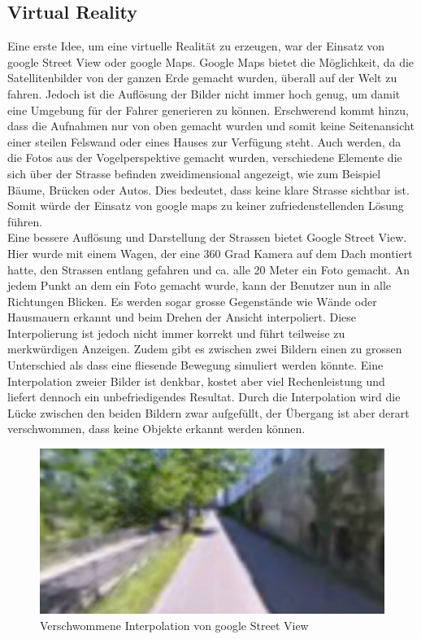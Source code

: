 \subsection{Virtual Reality}
Eine erste Idee, um eine virtuelle Realität zu erzeugen, war der Einsatz von google Street View oder google Maps. Google Maps bietet die Möglichkeit, da die Satellitenbilder von der ganzen Erde gemacht wurden, überall auf der Welt zu fahren. Jedoch ist die Auflösung der Bilder nicht immer hoch genug, um damit eine Umgebung für der Fahrer generieren zu können. Erschwerend kommt hinzu, dass die Aufnahmen nur von oben gemacht wurden und somit keine Seitenansicht einer steilen Felswand oder eines Hauses zur Verfügung steht. Auch werden, da die Fotos aus der Vogelperspektive gemacht wurden, verschiedene Elemente die sich über der Strasse befinden zweidimensional angezeigt, wie zum Beispiel Bäume, Brücken oder Autos. Dies bedeutet, dass keine klare Strasse sichtbar ist. Somit würde der Einsatz von google maps zu keiner zufriedenstellenden Lösung führen. \\
Eine bessere Auflösung und Darstellung der Strassen bietet Google Street View. Hier wurde mit einem Wagen, der eine 360 Grad Kamera auf dem Dach montiert hatte, den Strassen entlang gefahren und ca. alle 20 Meter ein Foto gemacht. An jedem Punkt an dem ein Foto gemacht wurde, kann der Benutzer nun in alle Richtungen Blicken. Es werden sogar grosse Gegenstände wie Wände oder Hausmauern erkannt und beim Drehen der Ansicht interpoliert. Diese Interpolierung ist jedoch nicht immer korrekt und führt teilweise zu merkwürdigen Anzeigen. Zudem gibt es zwischen zwei Bildern einen zu grossen Unterschied als dass eine fliesende Bewegung simuliert werden könnte. Eine Interpolation zweier Bilder ist denkbar, kostet aber viel Rechenleistung und liefert dennoch ein unbefriedigendes Resultat. Durch die Interpolation wird die Lücke zwischen den beiden Bildern zwar aufgefüllt, der Übergang ist aber derart verschwommen, dass keine Objekte erkannt werden können.
\begin{figure}[H]
\centering 
\includegraphics[width=1.0\linewidth]{src/screenshot_google_street_view_unscharf.png}
\caption{Verschwommene Interpolation von google Street View} %
\label{screenshot_google_street_view_unscharf} %
\end{figure}
